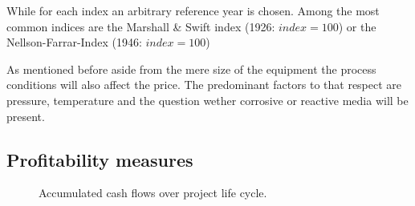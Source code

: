 While for each index an arbitrary reference year is chosen. Among the most common indices are the 
Marshall \& Swift index (1926: $index = 100$) or the Nellson-Farrar-Index (1946: $index = 100$)

As mentioned before aside from the mere size of the equipment the process conditions will also affect the 
price. The predominant factors to that respect are pressure, temperature and the question wether corrosive 
or reactive media will be present. 

\subsection{Profitability measures}
\begin{figure}
	\centering
	
	\caption{Accumulated cash flows over project life cycle.}
\end{figure}








